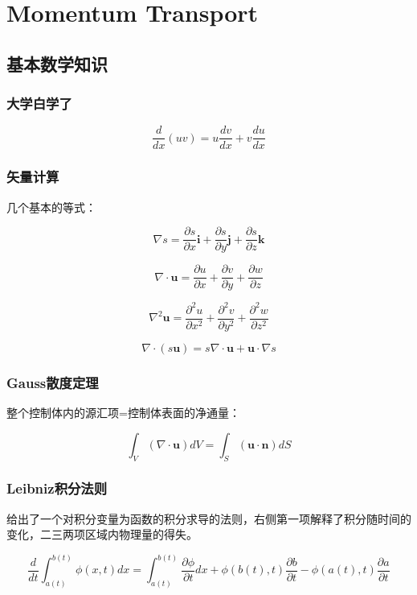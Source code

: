 \chapter{Momentum Transport}

\section{基本数学知识}
\subsection{大学白学了}

\[\frac{d}{dx}(uv) = u\frac{dv}{dx} + v\frac{du}{dx}\]

\subsection{矢量计算}

几个基本的等式：

\[\nabla s = \frac{\partial s}{\partial x}\bm{i} +  \frac{\partial s}{\partial y}\bm{j} + \frac{\partial s}{\partial z}\bm{k}\]

\[\nabla\cdot\bm{u} = \frac{\partial u}{\partial x} + \frac{\partial v}{\partial y} + \frac{\partial w}{\partial z}\]

\[\nabla^2\bm{u} = \frac{\partial^2 u}{\partial x^2} + \frac{\partial^2 v}{\partial y^2} + \frac{\partial^2 w}{\partial z^2} \]

\[\nabla\cdot (s\mathbf{u}) = s\nabla\cdot\bm{u}+\bm{u}\cdot\nabla s\]

\subsection{Gauss散度定理}
整个控制体内的源汇项=控制体表面的净通量：

\begin{equation}\label{Gauss}
\int_{V}(\nabla\cdot \bm{u})dV = \int_{S} (\bm{u\cdot n})dS
\end{equation}

\subsection{Leibniz积分法则}

给出了一个对积分变量为函数的积分求导的法则，右侧第一项解释了积分随时间的变化，二三两项区域内物理量的得失。

\begin{equation}
    \frac{d}{dt} \int_{a(t)}^{b(t)} \phi(x,t) dx = \int_{a(t)}^{b(t)} \frac{\partial \phi}{\partial t} dx + \phi(b(t),t) \frac{\partial b}{\partial t} - \phi(a(t),t)\frac{\partial a}{\partial t}
\end{equation}

